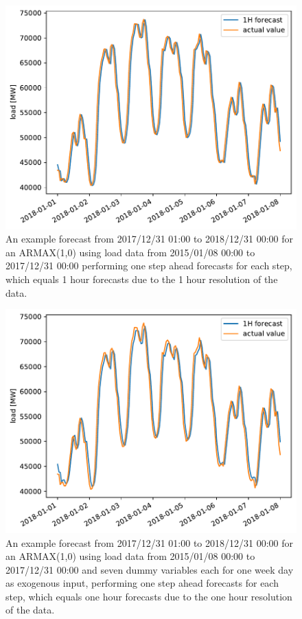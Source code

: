 \begin{figure}[h!]%
\centering
\includegraphics[width=\textwidth]{plots/ARMAXfc/ARMAX_p1q0_data2015to2017_fcto2018123100_plot_range2018010100_2018010800}%
\caption{An example forecast from 2017/12/31 01:00 to 2018/12/31 00:00 for an ARMAX(1,0) using load data from 2015/01/08 00:00 to 2017/12/31 00:00 performing one step ahead forecasts for each step, which equals 1 hour forecasts due to the 1 hour resolution of the data.}%
\label{fig:armax_fc}%
\end{figure}

\begin{figure}[h!]%
\centering
\includegraphics[width=\textwidth]{plots/ARMAXfc/ARMAX_p1q0_data2015to2017_fcto2018123100_dayofweek_plot_range2018010100_2018010800}%
\caption{An example forecast from 2017/12/31 01:00 to 2018/12/31 00:00 for an ARMAX(1,0) using load data from 2015/01/08 00:00 to 2017/12/31 00:00 and seven dummy variables each for one week day as exogenous input, performing one step ahead forecasts for each step, which equals one hour forecasts due to the one hour resolution of the data.}%
\label{fig:armax_fc_dayofweek}%
\end{figure}

